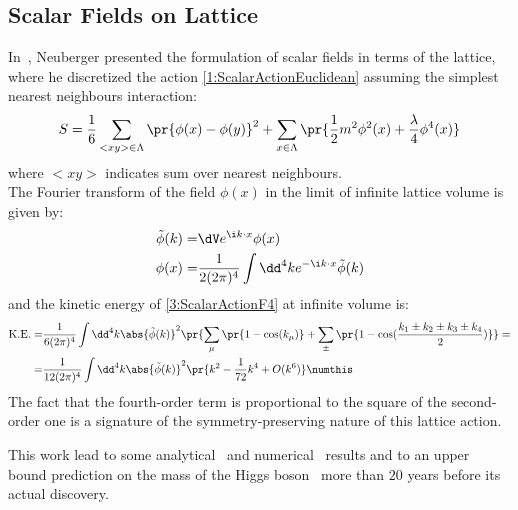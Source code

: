 \subsection{Scalar Fields on \spFtext Lattice}
In~\cite{Neuberger:1987kt}, Neuberger presented the formulation of scalar fields in terms of the \spFtext lattice, where he discretized the action \eqref{1:ScalarActionEuclidean} assuming the simplest nearest neighbours interaction:
\begin{equation}
    S = \frac16\sum_{<xy>\in\Lambda}\pr{\phi(x)-\phi(y)}^2 +\sum_{x\in\Lambda}\pr{\frac12m^2\phi^2(x)+\frac\lambda4\phi^4(x)} \label{3:ScalarActionF4}
\end{equation}
where $<xy>$ indicates sum over nearest neighbours.\\
The Fourier transform of the field $\phi(x)$ in the limit of infinite lattice volume is given by:
\begin{align*}
    \tilde\phi(k) =& \dV e^{\i k \cdot x} \phi(x) \\
    \phi(x) =& \frac1{2(2\pi)^4} \int\dd^4k e^{-\i k \cdot x} \tilde\phi(k)
\end{align*}
and the kinetic energy of \eqref{3:ScalarActionF4} at infinite volume is:
\begin{align*}
    \text{K.E.} =& \frac1{6(2\pi)^4} \int\dd^4k \abs{\tilde\phi(k)}^2\pr{\sum_\mu\pr{1-\cos(k_\mu)} +\sum_\pm\pr{1-\cos(\frac{k_1\pm k_2\pm k_3\pm k_4}{2})}} =\\
    =& \frac{1}{12(2\pi)^4} \int\dd^4k \abs{\tilde\phi(k)}^2\pr{k^2-\frac{1}{72}k^4+O(k^6)} \numthis\label{3:ScalarKE}
\end{align*}
The fact that the fourth-order term is proportional to the square of the second-order one is a signature of the symmetry-preserving nature of this lattice action.

This work lead to some analytical~\cite{Bhanot:1990zd} and numerical~\cite{Bhanot:1990ai} results and to an upper bound prediction on the mass of the Higgs boson~\cite{Heller:1990sg} more than $20$ years before its actual discovery.

